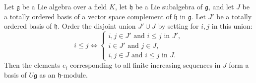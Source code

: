 Let $\mathfrak{g}$ be a Lie algebra over a field $K$, let $\mathfrak{h}$ be a Lie subalgebra of $\mathfrak{g}$, and let $J$ be a totally ordered basis of a vector space complement of $\mathfrak{h}$ in $\mathfrak{g}$. Let $J'$ be a totally ordered basis of $\mathfrak{h}$. Order the disjoint union $J' \cup J$ by setting for $i, j$ in this union:
$$
i \leq j \iff 
\begin{cases}
i, j \in J' \text{ and } i \leq j \text{ in } J', \\
i \in J' \text{ and } j \in J, \\
i, j \in J \text{ and } i \leq j \text{ in } J.
\end{cases}
$$
Then the elements $e_i$ corresponding to all finite increasing sequences in $J$ form a basis of $U\mathfrak{g}$ as an $\mathfrak{h}$-module.
